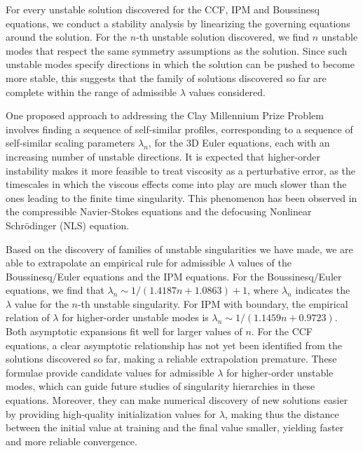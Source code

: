 \documentclass[fleqn,11pt]{wlscirep}
\begin{document}
For every unstable solution discovered for the CCF, IPM and Boussinesq equations, we conduct a stability analysis by linearizing the governing equations around the solution. For the $n$-th unstable solution discovered, we find $n$ unstable modes that respect the same symmetry assumptions as the solution. Since such unstable modes specify directions in which the solution can be pushed to become more stable, this suggests that the family of solutions discovered so far are complete within the range of admissible $\lambda$ values considered.

One proposed approach to addressing the Clay Millennium Prize Problem involves finding a sequence of self-similar profiles, corresponding to a sequence of self-similar scaling parameters $\lambda_n$, for the 3D Euler equations, each with an increasing number of unstable directions. It is expected that higher-order instability makes it more feasible to treat viscosity as a perturbative error, as the timescales in which the viscous effects come into play are much slower than the ones leading to the finite time singularity. This phenomenon has been observed in the compressible Navier-Stokes equations and the defocusing Nonlinear Schr\"odinger (NLS) equation\cite{Merle-Raphael-Rodnianski-Szeftel:implosion-ii,Merle-Raphael-Rodnianski-Szeftel:implosion-nls}.

Based on the discovery of families of unstable singularities we have made, we are able to extrapolate an empirical rule for admissible $\lambda$ values of the Boussinesq/Euler equations and the IPM equations. For the Boussinesq/Euler equations, we find that $\lambda_n \sim 1/(1.4187n + 1.0863) + 1$, where $\lambda_n$ indicates the $\lambda$ value for the $n$-th unstable singularity. For IPM with boundary, the empirical relation of $\lambda$ for higher-order unstable modes is $\lambda_n \sim 1/(1.1459n + 0.9723)$. Both asymptotic expansions fit well for larger values of $n$. For the CCF equations, a clear asymptotic relationship has not yet been identified from the solutions discovered so far, making a reliable extrapolation premature. These formulae provide candidate values for admissible $\lambda$ for higher-order unstable modes, which can guide future studies of singularity hierarchies in these equations. Moreover, they can make numerical discovery of new solutions easier by providing high-quality initialization values for $\lambda$, making thus the distance between the initial value at training and the final value smaller, yielding faster and more reliable convergence.
\end{document}
